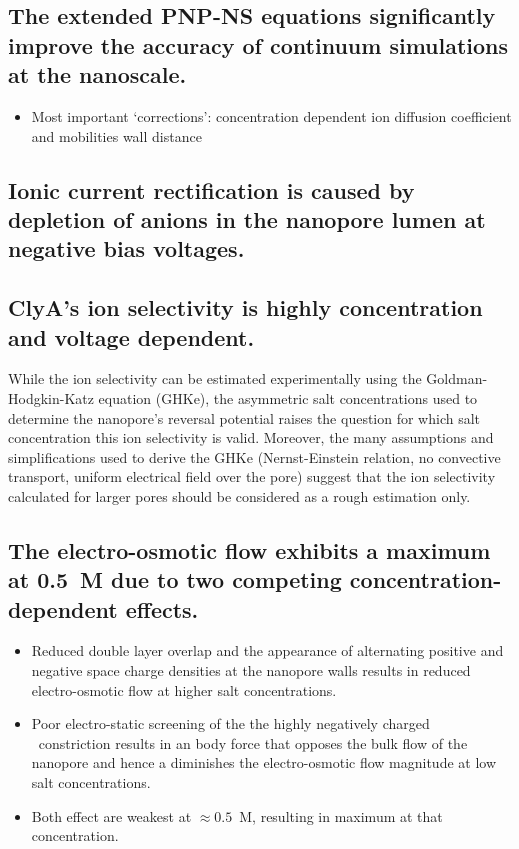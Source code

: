 \documentclass[journal=ancac3,manuscript=article,etalmode=truncate,maxauthors=0,layout=twocolumn]{achemso}
\begin{document}
\subsection{The extended PNP-NS equations significantly improve the accuracy of continuum simulations at the 
nanoscale.}

\begin{itemize}
  \item Most important `corrections':
  \subitem concentration dependent ion diffusion coefficient and mobilities
  \subitem wall distance 
\end{itemize}

\subsection{Ionic current rectification is caused by depletion of anions in the nanopore lumen at negative 
bias voltages.}

\subsection{ClyA's ion selectivity is highly concentration and voltage dependent.}
While the ion selectivity can be estimated experimentally using the Goldman-Hodgkin-Katz 
equation (GHKe),\cite{Franceschini-2016,Huang-2017} the asymmetric salt concentrations used to determine the 
nanopore's reversal potential raises the question for which salt concentration this ion selectivity is valid.
Moreover, the many assumptions and simplifications used to derive the GHKe (Nernst-Einstein relation, no 
convective transport, uniform electrical field over the pore) suggest that the ion selectivity calculated for 
larger pores should be considered as a rough estimation only.

\subsection{The electro-osmotic flow exhibits a maximum at 0.5~M due to two competing concentration-dependent 
effects.}

\begin{itemize}
  \item Reduced double layer overlap and the appearance of alternating positive and negative space charge 
  densities at the nanopore walls results in reduced electro-osmotic flow at higher salt concentrations.
  \item Poor electro-static screening of the the highly negatively charged \trans\ constriction 
  results in an body force that opposes the bulk flow of the nanopore and hence a diminishes the 
  electro-osmotic flow magnitude at low salt concentrations.
  \item Both effect are weakest at $\approx0.5$~M, resulting in maximum at that concentration.
\end{itemize}
\end{document}

